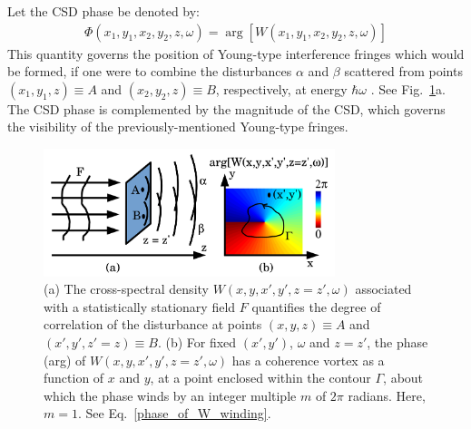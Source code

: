 \documentclass[%
 reprint,
 amsmath,amssymb,
 aps,
]{revtex4-1}
\begin{document}
Let the CSD phase be denoted by:
\begin{equation}
\begin{aligned}
\label{phase_of_W}
\Phi(x_1,y_1,x_2,y_2,z,\omega)=\arg[W(x_1,y_1,x_2,y_2,z,\omega)]
\end{aligned}
\end{equation}
This quantity governs the position of Young-type interference fringes which would be formed, if one were to combine the disturbances $\alpha$ and $\beta$ scattered from points $(x_1,y_1,z)\equiv A$ and $(x_2,y_2,z)\equiv B$, respectively, at energy $\hbar\omega$ \cite{mandel_wolf}.  See Fig.~\ref{loss_of_fringe_visibility}a. The  CSD phase is complemented by the magnitude of the CSD, which governs the visibility of the previously-mentioned Young-type fringes.

\begin{figure}
\includegraphics[width=8.5cm]{Figures/coherence_vortex.png}
\caption{(a) The cross-spectral density $W(x,y,x',y',z=z',\omega)$ associated with a statistically stationary field $F$ quantifies the degree of correlation of the disturbance at points $(x,y,z)\equiv A$ and $(x',y',z'=z)\equiv B$. (b) For fixed $(x',y')$, $\omega$ and $z=z'$, the phase (arg) of $W(x,y,x',y',z=z',\omega)$ has a coherence vortex as a function of $x$ and $y$, at a point enclosed within the contour $\Gamma$, about which the phase winds by an integer multiple $m$ of $2\pi$ radians. Here, $m=1$.  See Eq.~\ref{phase_of_W_winding}.}
\label{loss_of_fringe_visibility}
\end{figure}
\end{document}

